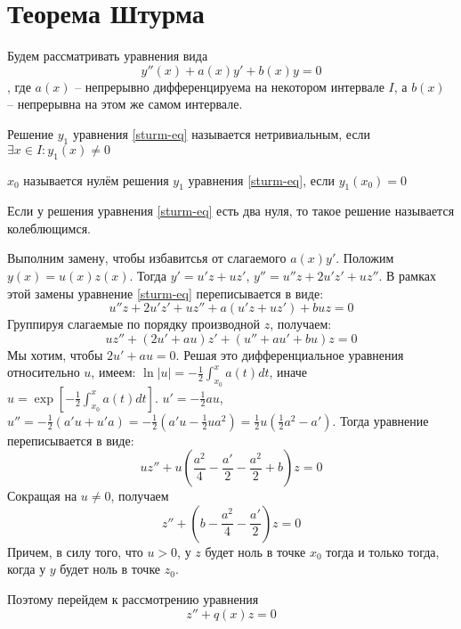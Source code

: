 \documentclass[document.tex]{subfiles}
\begin{document}
\section{Теорема Штурма}
Будем рассматривать уравнения вида 
\begin{equation}
    \label{sturm-eq}
    y''(x) + a(x)y' + b(x)y = 0
\end{equation}
, где $a(x)$ -- непрерывно дифференцируема на некотором
интервале $I$, а $b(x)$ -- непрерывна на этом же самом интервале.

\begin{definition}
    Решение $y_1$ уравнения \ref{sturm-eq} называется нетривиальным, если $\exists x \in I: y_1(x) \neq 0$
\end{definition}

\begin{definition}
    $x_0$ называется нулём решения $y_1$ уравнения \ref{sturm-eq}, если $y_1(x_0) = 0$
\end{definition}

\begin{definition}
    Если у решения уравнения \ref{sturm-eq} есть два нуля, то такое решение называется колеблющимся.
\end{definition}

Выполним замену, чтобы избавитсья от слагаемого $a(x)y'$. Положим $y(x) = u(x) z(x)$. Тогда $y' = u'z + uz'$, $y'' =
u''z + 2u'z' + uz''$. В рамках этой замены уравнение \ref{sturm-eq} переписывается в виде:
\[
    u''z + 2u'z' + uz'' + a(u'z + uz') + buz = 0
\]
Группируя слагаемые по порядку производной $z$, получаем:
\[
    uz'' + (2u' + au)z' + (u'' + au' + bu)z = 0
\]
Мы хотим, чтобы $2u' + au = 0$. Решая это дифференциальное уравнения относительно $u$, имеем: $\ln |u| =
-\frac{1}{2}\int_{x_0}^{x}a(t)dt$, иначе $u = \exp \left[ -\frac{1}{2}\int_{x_0}^{x}a(t)dt \right]$. $u' =
-\frac{1}{2} a u$, $u'' = -\frac{1}{2}(a'u + u'a) = -\frac{1}{2}(a'u - \frac{1}{2}u a^2) =
\frac{1}{2}u(\frac{1}{2}a^2 - a')$. Тогда уравнение переписывается в виде:
\[
    uz'' + u(\frac{a^2}{4} - \frac{a'}{2} - \frac{a^2}{2} + b)z = 0
\]
Сокращая на $u \neq 0$, получаем
\[
    z'' + (b - \frac{a^2}{4} - \frac{a'}{2})z = 0
\]
Причем, в силу того, что $u > 0$, у $z$ будет ноль в точке $x_0$ тогда и только тогда, когда у $y$ будет ноль в точке
$z_0$.

Поэтому перейдем к рассмотрению уравнения
\begin{equation}
    \label{sturm}
    z'' + q(x)z = 0
\end{equation}
\end{document}
